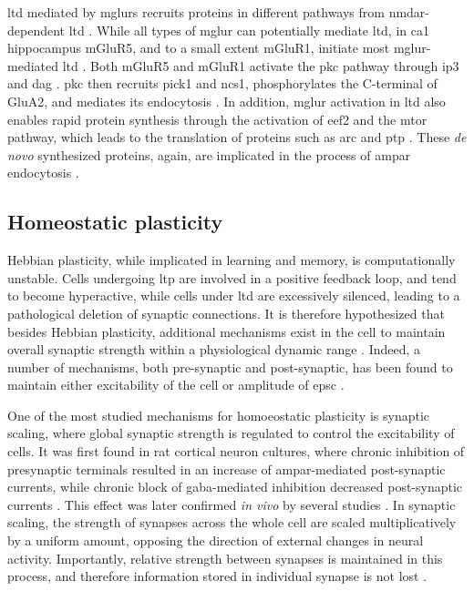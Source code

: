 \Gls{ltd} mediated by \glspl{mglur} recruits proteins in different pathways from \gls{nmdar}-dependent \gls{ltd} \citep{gladding09}. While all types of \gls{mglur} can potentially mediate \gls{ltd}, in \gls{ca1} hippocampus mGluR5, and to a small extent mGluR1, initiate most \gls{mglur}-mediated \gls{ltd} \citep{luscher10}. Both mGluR5 and mGluR1 activate the \gls{pkc} pathway through \gls{ip3} and \gls{dag} \citep{oliet97}. \Gls{pkc} then recruits \gls{pick1} and \gls{ncs1}, phosphorylates the C-terminal of GluA2, and mediates its endocytosis \citep{bellone06, jo08}. In addition, \gls{mglur} activation in \gls{ltd} also enables rapid protein synthesis through the activation of \gls{eef2} and the \gls{mtor} pathway, which leads to the translation of proteins such as \gls{arc} and \gls{ptp} \citep{park08, zhang08}. These \textit{de novo} synthesized proteins, again, are implicated in the process of \gls{ampar} endocytosis \citep{collingridge10}.

\subsection{Homeostatic plasticity}
Hebbian plasticity, while implicated in learning and memory, is computationally unstable. Cells undergoing \gls{ltp} are involved in a positive feedback loop, and tend to become hyperactive, while cells under \gls{ltd} are excessively silenced, leading to a pathological deletion of synaptic connections. It is therefore hypothesized that besides Hebbian plasticity, additional mechanisms exist in the cell to maintain overall synaptic strength within a physiological dynamic range \citep{bienenstock82, cooper12}. Indeed, a number of mechanisms, both pre-synaptic and post-synaptic, has been found to maintain either excitability of the cell or amplitude of \gls{epsc} \citep{turrigiano98, frank06, collingridge10, chater14, wang16}. 

One of the most studied mechanisms for homoeostatic plasticity is synaptic scaling, where global synaptic strength is regulated to control the excitability of cells. It was first found in rat cortical neuron cultures, where chronic inhibition of presynaptic terminals resulted in an increase of \gls{ampar}-mediated post-synaptic currents, while chronic block of \gls{gaba}-mediated inhibition decreased post-synaptic currents \citep{turrigiano98}. This effect was later confirmed \textit{in vivo} by several studies \citep{whitt14}. In synaptic scaling, the strength of synapses across the whole cell are scaled multiplicatively by a uniform amount, opposing the direction of external changes in neural activity. Importantly, relative strength between synapses is maintained in this process, and therefore information stored in individual synapse is not lost \citep{turrigiano08}. 

